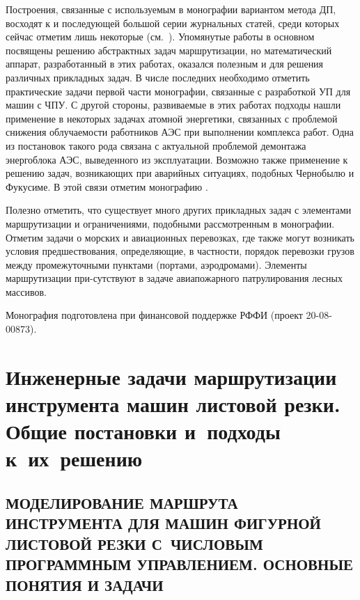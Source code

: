 \documentclass[11pt,twoside,openany]{report}
\begin{document}
Построения, связанные с используемым в монографии
вариантом метода ДП, восходят к
\cite{Cha1`} и последующей большой серии
журнальных статей,
среди которых сейчас отметим лишь некоторые
(см.~\cite{Cha8`,intro51,intro52,intro53,intro54,intro55,intro56}).
Упомянутые работы
\cite{Cha8`,intro51,intro52,intro53,intro54,intro55,intro56}
в основном посвящены решению абстрактных задач маршрутизации,
но математический аппарат, разработанный в этих работах,
оказался полезным и для решения различных прикладных задач.
В числе последних
необходимо
отметить практические задачи первой части монографии,
связанные с разработкой УП для машин с ЧПУ.
С другой стороны, развиваемые в этих работах подходы
нашли применение в некоторых задачах атомной энергетики,
связанных с проблемой снижения облучаемости работников АЭС
при выполнении комплекса работ.
Одна из постановок такого рода связана с
актуальной проблемой демонтажа энергоблока АЭС,
выведенного из эксплуатации.
Возможно также применение к решению задач,
возникающих при аварийных ситуациях,
подобных Чернобылю и Фукусиме.
В этой связи отметим монографию \cite{Cha2`}.

Полезно отметить, что существует много других прикладных задач
с элементами маршрутизации и ограничениями,
подобными рассмотренным в монографии.
Отметим задачи о морских и авиационных перевозках,
где также могут возникать условия предшествования,
определяющие, в частности, порядок перевозки грузов
между промежуточными пунктами (портами, аэродромами).
Элементы маршрутизации при-сутствуют в задаче
авиапожарного патрулирования лесных массивов.

Монография подготовлена при финансовой поддержке РФФИ
(проект 20-08-00873).


\part{Инженерные задачи
маршрутизации инструмента машин листовой резки.
Общие постановки
и~подходы к~их~решению}

\chapter{МОДЕЛИРОВАНИЕ МАРШРУТА ИНСТРУМЕНТА ДЛЯ МАШИН ФИГУРНОЙ ЛИСТОВОЙ РЕЗКИ
С~ЧИСЛОВЫМ ПРОГРАММНЫМ УПРАВЛЕНИЕМ.
ОСНОВНЫЕ ПОНЯТИЯ И ЗАДАЧИ}
\setcounter{chapter}{1}
\setcounter{equation}{0}
\end{document}

